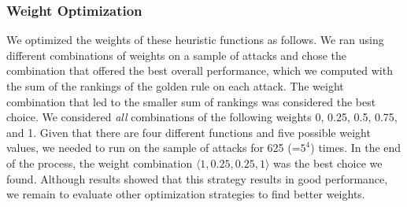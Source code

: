 \documentclass[conference]{IEEEtran}
\begin{document}
\subsubsection{Weight Optimization}
\label{sec:weight-optimization}
We optimized the weights of these heuristic functions as follows. We
ran \tname{} using different combinations of weights on a sample of
attacks and chose the combination that offered the best overall
performance, which we computed with the sum of the rankings of the
golden rule on each attack. The weight combination that led to the
smaller sum of rankings was considered the best choice. We considered
\emph{all} combinations of the following weights 0, 0.25, 0.5, 0.75,
and 1. Given that there are four different functions and five possible
weight values, we needed to run \tname{} on the sample of attacks for
625 (=$5^4$) times. In the end of the process, the weight combination
$\langle{}1,0.25,0.25,1\rangle$ was the best choice we found. Although
results showed that this strategy results in good performance, we
remain to evaluate other optimization strategies to find better
weights. 

 
\end{document}
